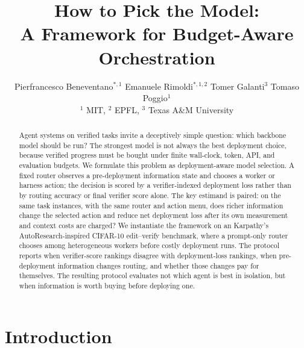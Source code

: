 \documentclass{article}
\title{How to Pick the Model:\\
A Framework for Budget-Aware Orchestration}
\author{%
  \!\!\!\!\!
  Pierfrancesco Beneventano$^{*,1}$ \quad Emanuele Rimoldi$^{*,1,2}$ \quad Tomer Galanti$^3$ \quad Tomaso Poggio$^1$ \\
  $^1$ MIT, $^2$ EPFL, $^3$ Texas A\&M University
}
\newcommand{\pier}[1]{{\color{red}Pier: #1}}
\begin{document}
\maketitle

\begin{abstract}
Agent systems on verified tasks invite a deceptively simple question: which backbone model should be run? The strongest model is not always the best deployment choice, because verified progress must be bought under finite wall-clock, token, API, and evaluation budgets. We formulate this problem as deployment-aware model selection. A fixed router observes a pre-deployment information state and chooses a worker or harness action; the decision is scored by a verifier-indexed deployment loss rather than by routing accuracy or final verifier score alone. The key estimand is paired: on the same task instances, with the same router and action menu, does richer information change the selected action and reduce net deployment loss after its own measurement and context costs are charged? We instantiate the framework on an Karpathy's AutoResearch-inspired CIFAR-10 edit--verify benchmark, where a prompt-only router chooses among heterogeneous workers before costly deployment runs. The protocol reports when verifier-score rankings disagree with deployment-loss rankings, when pre-deployment information changes routing, and whether those changes pay for themselves. The resulting protocol evaluates not which agent is best in isolation, but when information is worth buying before deploying one.
\end{abstract}

\section{Introduction}
\label{sec:intro}

\end{document}
